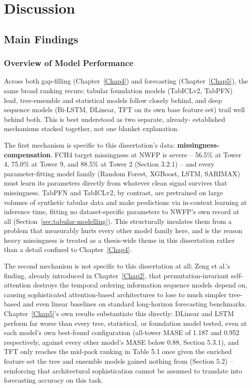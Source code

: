\chapter{Discussion} \label{Chap7}

\section{Main Findings}

\subsection{Overview of Model Performance}

Across both gap-filling (Chapter~\ref{Chap4}) and forecasting (Chapter~\ref{Chap5}), the same
broad ranking recurs: tabular foundation models (TabICLv2, TabPFN) lead, tree-ensemble and
statistical models follow closely behind, and deep sequence models (Bi-LSTM, DLinear, TFT on its
own base feature set) trail well behind both. This is best understood as two separate, already-
established mechanisms stacked together, not one blanket explanation.

The first mechanism is specific to this dissertation's data: \textbf{missingness-compensation}. FCH4
target missingness at NWFP is severe -- 56.5\% at Tower 4, 75.0\% at Tower 9, and 88.5\% at Tower 2
(Section 3.2.1) -- and every parameter-fitting model family (Random Forest, XGBoost, LSTM, SARIMAX)
must learn its parameters directly from whatever clean signal survives that missingness. TabPFN and
TabICLv2, by contrast, are pretrained on large volumes of synthetic tabular data and make
predictions via in-context learning at inference time, fitting no dataset-specific parameters to
NWFP's own record at all (Section~\ref{sec:tabular-modelling}). This structurally insulates them
from a problem that measurably hurts every other model family here, and is the reason heavy
missingness is treated as a thesis-wide theme in this dissertation rather than a detail confined to
Chapter~\ref{Chap4}.

The second mechanism is not specific to this dissertation at all: Zeng et al.'s finding, already
introduced in Chapter~\ref{Chap2}, that permutation-invariant self-attention destroys the temporal
ordering information sequence models depend on, causing sophisticated attention-based architectures
to lose to much simpler tree-based and even linear baselines on standard long-horizon forecasting
benchmarks. Chapter~\ref{Chap5}'s own results substantiate this directly: DLinear and LSTM perform
far worse than every tree, statistical, or foundation model tested, even at each model's own
best-found configuration (all-tower MASE of 1.187 and 0.952 respectively, against every other
model's MASE below 0.88, Section 5.3.1), and
TFT only reaches the mid-pack ranking in Table 5.1 once given the enriched feature set the tree and
ensemble models gained nothing from (Section 5.2) -- reinforcing that architectural sophistication
cannot be assumed to translate into forecasting accuracy on this task.


